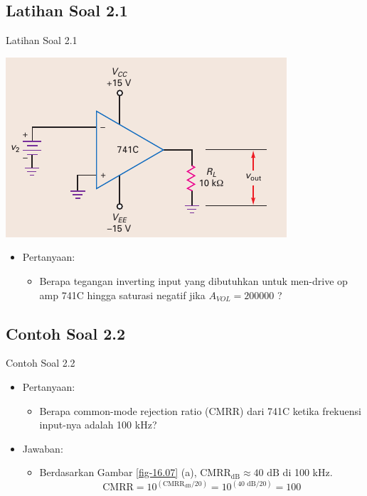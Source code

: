 \subsection{Latihan Soal 2.1}
\begin{frame}{Latihan Soal 2.1}
	\begin{multicols}{2}
		\begin{center}
			\includegraphics[width=\linewidth]{gambar/fig-16.11a}
		\end{center}
		\columnbreak
		\begin{itemize}
			\item Pertanyaan:
			\begin{itemize}
				\item Berapa tegangan inverting input yang dibutuhkan untuk men-drive op amp 741C hingga saturasi negatif jika $ A_{VOL} = 200000 $ ?
			\end{itemize}
		\end{itemize}
	\end{multicols}
\end{frame}

\subsection{Contoh Soal 2.2}
\begin{frame}{Contoh Soal 2.2}
	\begin{itemize}
		\item Pertanyaan:
		\begin{itemize}
			\item Berapa common-mode rejection ratio (CMRR) dari 741C ketika frekuensi input-nya adalah 100 kHz?
		\end{itemize}
		\item Jawaban:
		\begin{itemize}
			\item Berdasarkan Gambar \ref{fig-16.07} (a), $ \text{CMRR}_{\text{dB}} \approx 40 \text{ dB} $ di 100 kHz.
			\[ \text{CMRR} = 10^{(\text{CMRR}_{\text{dB}}/20)} = 10^{(40 \text{ dB}/20)} = 100\]
		\end{itemize}
	\end{itemize}
\end{frame}

